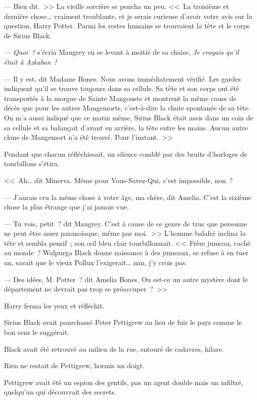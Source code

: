 --- Bien dit.~>> La vieille sorcière se pencha un peu. <<~La troisième et dernière chose… vraiment troublante, et je serais curieuse d'avoir votre avis sur la question, Harry Potter. Parmi les restes humains se trouvaient la tête et le corps de Sirius Black.

--- \emph{Quoi~?} s'écria Maugrey en se levant à moitié de sa chaise. \emph{Je croyais qu'il était à Azkaban~!}

--- Il y est, dit Madame Bones. Nous avons immédiatement vérifié. Les gardes indiquent qu'il se trouve toujours dans sa cellule. Sa tête et son corps ont été transportés à la morgue de Sainte Mangouste et montrent la même cause de décès que pour les autres Mangemorts, c'est-à-dire la chute spontanée de sa tête. On m'a aussi indiqué que ce matin même, Sirius Black était assis dans un coin de sa cellule et sa balançait d'avant en arrière, la tête entre les mains. Aucun autre clone de Mangemort n'a été trouvé. Pour l'instant.~>>

Pendant que chacun réfléchissait, un silence comblé par des bruits d'horloges de tourbillons s'étira.

<<~Ah… dit Minerva. Même pour Vous-Savez-Qui, c'est impossible, non~?

--- J'aurais cru la même chose à votre âge, ma chère, dit Amelia. C'est la sixième chose la plus étrange que j'ai jamais vue.

--- Tu vois, petit~? dit Maugrey. C'est à cause de ce genre de truc que personne ne peut être assez paranoïaque, même pas moi.~>> L'homme balafré inclina la tête et sembla pensif~; son œil bleu clair tourbillonnait. <<~Frère jumeau, caché au monde~? Walpurga Black donne naissance à des jumeaux, se refuse à en tuer un, savait que le vieux Pollux l'exigerait… nan, j'y crois pas.

--- Des idées, M. Potter~? dit Amelia Bones. Ou est-ce un autre mystère dont le département ne devrait pas trop se préoccuper~?~>>

Harry ferma les yeux et réfléchit.

Sirius Black avait pourchassé Peter Pettigrew au lieu de fuir le pays comme le bon sens le suggérait.

Black avait été retrouvé au milieu de la rue, entouré de cadavres, hilare.

Rien ne restait de Pettigrew, hormis un doigt.

Pettigrew avait été un espion des gentils, pas un agent double mais un infiltré, quelqu'un qui découvrait des secrets.

